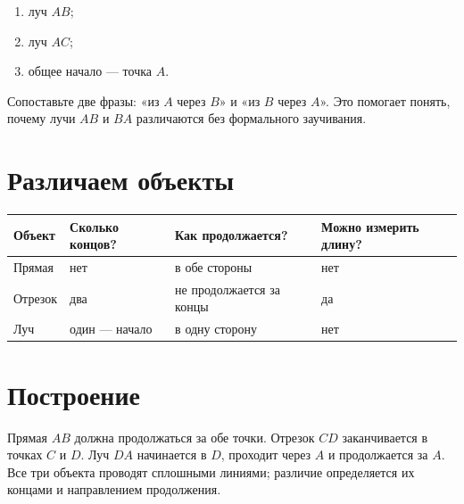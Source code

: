 \oppositeraysfigure

\begin{practicebox}
  \begin{enumerate}[label=\alph*),itemsep=0.35em]
    \item луч \(AB\);
    \item луч \(AC\);
    \item общее начало — точка \(A\).
  \end{enumerate}
\end{practicebox}

\begin{teacherbox}
  Сопоставьте две фразы: «из \(A\) через \(B\)» и «из \(B\) через \(A\)».
  Это помогает понять, почему лучи \(AB\) и \(BA\) различаются без
  формального заучивания.
\end{teacherbox}

\section{Различаем объекты}

\identifyobjectsanswersfigure

\begin{center}
  \renewcommand{\arraystretch}{1.42}
  \begin{tabularx}{\textwidth}{
    >{\raggedright\arraybackslash}p{}
    >{\centering\arraybackslash}p{}
    >{\raggedright\arraybackslash}p{}
    >{\centering\arraybackslash}X}
    \toprule
    \rowcolor{TableHeader}
    Объект & Сколько концов? & Как продолжается? & Можно измерить длину? \\
    \midrule
    Прямая & нет & в обе стороны & нет \\
    Отрезок & два & не продолжается за концы & да \\
    Луч & один — начало & в одну сторону & нет \\
    \bottomrule
  \end{tabularx}
\end{center}

\section{Построение}

\constructionanswersfigure

\begin{teacherbox}
  Прямая \(AB\) должна продолжаться за обе точки. Отрезок \(CD\) заканчивается
  в точках \(C\) и \(D\). Луч \(DA\) начинается в \(D\), проходит через
  \(A\) и продолжается за \(A\). Все три объекта проводят сплошными линиями; различие определяется их
  концами и направлением продолжения.
\end{teacherbox}


